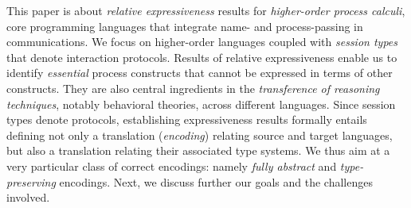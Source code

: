 \noi 
This paper is about \emph{relative expressiveness} results for 
\emph{higher-order process calculi}, core programming languages that 
integrate name- and process-passing in communications.
We focus on higher-order languages coupled with \emph{session types} that denote interaction protocols. 
Results of relative expressiveness 
enable us to identify \emph{essential} process constructs that cannot be expressed in terms of other constructs. They are also central 
ingredients in the   \emph{transference of reasoning techniques}, notably behavioral theories, across different languages.
Since session types denote protocols, 
 establishing expressiveness results formally entails defining 
 not only a translation (\emph{encoding})
relating source and target languages, but also a translation 
relating their associated type systems. 
We thus aim at a very particular class of correct encodings: namely \emph{fully abstract} and \emph{type-preserving} encodings.
Next, we discuss further our goals and the challenges involved.

